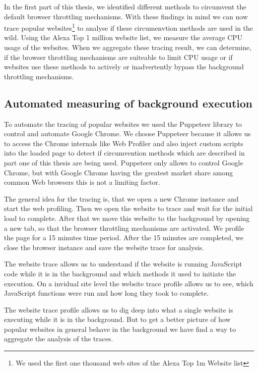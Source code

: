 \documentclass[article,type=bsc,colorback,accentcolor=tud9c]{tudthesis}
\begin{document}
  In the first part of this thesis, we identified different methods to circumvent the default browser throttling mechanisms. With these findings in mind we can now trace popular websites\footnote{We used the first one thousand web sites of the Alexa Top 1m Website list} to analyse if these circumenvtion methods are used in the wild. Using the Alexa Top 1 million website list, we measure the average CPU usage of the websites. When we aggregate these tracing result, we can determine, if the browser throttling mechanisms are suiteable to limit CPU usage or if websites use these methods to actively or inadvertently bypass the background throttling mechanisms.
  
  \subsection{Automated measuring of background execution}

  To automate the tracing of popular websites we used the Puppeteer\cite{pptr} library to control and automate Google Chrome. We choose Puppeteer because it allows us to access the Chrome internals like Web Profiler and also inject custom scripts into the loaded page to detect if circumvention methods which are described in part one of this thesis are being used. Puppeteer only allows to control Google Chrome, but with Google Chrome having the greatest market share among common Web browsers this is not a limiting factor.

  The general idea for the tracing is, that we open a new Chrome instance and start the web profiling. Then we open the website to trace and wait for the initial load to complete. After that we move this website to the background by opening a new tab, so that the browser throttling mechanisms are activated. We profile the page for a 15 minutes time period. After the 15 minutes are completed, we close the browser instance and save the website trace for analysis.

  The website trace allows us to understand if the website is running JavaScript code while it is in the background and which methods it used to initiate the execution. On a invidual site level the website trace profile allows us to see, which JavaScript functions were run and how long they took to complete.

  The website trace profile allows us to dig deep into what a single website is executing while it is in the background. But to get a better picture of how popular websites in general behave in the background we have find a way to aggregate the analysis of the traces.
\end{document}
